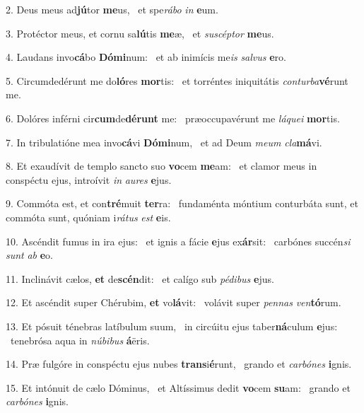 2. Deus meus ad\textbf{jú}tor \textbf{me}us, \ast\  et spe\textit{rá}\textit{bo} \textit{in} \textbf{e}um.\

3. Protéctor meus, et cornu sa\textbf{lú}tis \textbf{me}æ, \ast\  et \textit{su}\textit{scép}\textit{tor} \textbf{me}us.\

4. Laudans invo\textbf{cá}bo \textbf{Dó}\textbf{mi}num: \ast\  et ab inimícis me\textit{is} \textit{sal}\textit{vus} \textbf{e}ro.\

5. Circumdedérunt me do\textbf{ló}res \textbf{mor}tis: \ast\  et torréntes iniquitátis \textit{con}\textit{tur}\textit{ba}\textbf{vé}runt me.\

6. Dolóres inférni cir\textbf{cum}de\textbf{dé}\textbf{runt} me: \ast\  præoccupavérunt me \textit{lá}\textit{que}\textit{i} \textbf{mor}tis.\

7. In tribulatióne mea invo\textbf{cá}vi \textbf{Dó}\textbf{mi}num, \ast\  et ad Deum \textit{me}\textit{um} \textit{cla}\textbf{má}vi.\

8. Et exaudívit de templo sancto suo \textbf{vo}cem \textbf{me}am: \ast\  et clamor meus in conspéctu ejus, introívit \textit{in} \textit{au}\textit{res} \textbf{e}jus.\

9. Commóta est, et con\textbf{tré}muit \textbf{ter}ra: \ast\  fundaménta móntium conturbáta sunt, et commóta sunt, quóniam i\textit{rá}\textit{tus} \textit{est} \textbf{e}is.\

10. Ascéndit fumus in ira ejus: \dag\  et ignis a fácie \textbf{e}jus ex\textbf{ár}sit: \ast\  carbónes succén\textit{si} \textit{sunt} \textit{ab} \textbf{e}o.\

11. Inclinávit cælos, \textbf{et} de\textbf{scén}dit: \ast\  et calígo sub \textit{pé}\textit{di}\textit{bus} \textbf{e}jus.\

12. Et ascéndit super Chérubim, \textbf{et} vo\textbf{lá}vit: \ast\  volávit super \textit{pen}\textit{nas} \textit{ven}\textbf{tó}rum.\

13. Et pósuit ténebras latíbulum suum, \dag\  in circúitu ejus taber\textbf{ná}culum \textbf{e}jus: \ast\  tenebrósa aqua in \textit{nú}\textit{bi}\textit{bus} \textbf{á}ëris.\

14. Præ fulgóre in conspéctu ejus nubes \textbf{trans}i\textbf{é}runt, \ast\  grando et \textit{car}\textit{bó}\textit{nes} \textbf{i}gnis.\

15. Et intónuit de cælo Dóminus, \dag\  et Altíssimus dedit \textbf{vo}cem \textbf{su}am: \ast\  grando et \textit{car}\textit{bó}\textit{nes} \textbf{i}gnis.\

